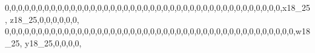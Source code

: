 \documentclass[]{article}
\newenvironment{Shaded}{\begin{snugshade}}{\end{snugshade}}
\newcommand{\DecValTok}[1]{\textcolor[rgb]{0.00,0.00,0.81}{#1}}
\newcommand{\NormalTok}[1]{#1}
\begin{document}
\begin{Shaded}
\begin{Highlighting}[]
\DecValTok{0}\NormalTok{,}\DecValTok{0}\NormalTok{,}\DecValTok{0}\NormalTok{,}\DecValTok{0}\NormalTok{,}\DecValTok{0}\NormalTok{,}\DecValTok{0}\NormalTok{,}\DecValTok{0}\NormalTok{,}\DecValTok{0}\NormalTok{,}\DecValTok{0}\NormalTok{,}\DecValTok{0}\NormalTok{,}\DecValTok{0}\NormalTok{,}\DecValTok{0}\NormalTok{,}\DecValTok{0}\NormalTok{,}\DecValTok{0}\NormalTok{,}\DecValTok{0}\NormalTok{,}\DecValTok{0}\NormalTok{,}\DecValTok{0}\NormalTok{,}\DecValTok{0}\NormalTok{,}\DecValTok{0}\NormalTok{,}\DecValTok{0}\NormalTok{,}\DecValTok{0}\NormalTok{,}\DecValTok{0}\NormalTok{,}\DecValTok{0}\NormalTok{,}\DecValTok{0}\NormalTok{,}\DecValTok{0}\NormalTok{,}\DecValTok{0}\NormalTok{,}\DecValTok{0}\NormalTok{,}\DecValTok{0}\NormalTok{,}\DecValTok{0}\NormalTok{,}\DecValTok{0}\NormalTok{,}\DecValTok{0}\NormalTok{,}\DecValTok{0}\NormalTok{,}\DecValTok{0}\NormalTok{,}\DecValTok{0}\NormalTok{,}\DecValTok{0}\NormalTok{,}\DecValTok{0}\NormalTok{,}\DecValTok{0}\NormalTok{,}\DecValTok{0}\NormalTok{,}\DecValTok{0}\NormalTok{,}\DecValTok{0}\NormalTok{,}\DecValTok{0}\NormalTok{,}\DecValTok{0}\NormalTok{,x18_}\DecValTok{25}\NormalTok{, z18_}\DecValTok{25}\NormalTok{,}\DecValTok{0}\NormalTok{,}\DecValTok{0}\NormalTok{,}\DecValTok{0}\NormalTok{,}\DecValTok{0}\NormalTok{,}\DecValTok{0}\NormalTok{,}\DecValTok{0}\NormalTok{,}
\DecValTok{0}\NormalTok{,}\DecValTok{0}\NormalTok{,}\DecValTok{0}\NormalTok{,}\DecValTok{0}\NormalTok{,}\DecValTok{0}\NormalTok{,}\DecValTok{0}\NormalTok{,}\DecValTok{0}\NormalTok{,}\DecValTok{0}\NormalTok{,}\DecValTok{0}\NormalTok{,}\DecValTok{0}\NormalTok{,}\DecValTok{0}\NormalTok{,}\DecValTok{0}\NormalTok{,}\DecValTok{0}\NormalTok{,}\DecValTok{0}\NormalTok{,}\DecValTok{0}\NormalTok{,}\DecValTok{0}\NormalTok{,}\DecValTok{0}\NormalTok{,}\DecValTok{0}\NormalTok{,}\DecValTok{0}\NormalTok{,}\DecValTok{0}\NormalTok{,}\DecValTok{0}\NormalTok{,}\DecValTok{0}\NormalTok{,}\DecValTok{0}\NormalTok{,}\DecValTok{0}\NormalTok{,}\DecValTok{0}\NormalTok{,}\DecValTok{0}\NormalTok{,}\DecValTok{0}\NormalTok{,}\DecValTok{0}\NormalTok{,}\DecValTok{0}\NormalTok{,}\DecValTok{0}\NormalTok{,}\DecValTok{0}\NormalTok{,}\DecValTok{0}\NormalTok{,}\DecValTok{0}\NormalTok{,}\DecValTok{0}\NormalTok{,}\DecValTok{0}\NormalTok{,}\DecValTok{0}\NormalTok{,}\DecValTok{0}\NormalTok{,}\DecValTok{0}\NormalTok{,}\DecValTok{0}\NormalTok{,}\DecValTok{0}\NormalTok{,}\DecValTok{0}\NormalTok{,}\DecValTok{0}\NormalTok{,}\DecValTok{0}\NormalTok{,}\DecValTok{0}\NormalTok{,w18_}\DecValTok{25}\NormalTok{, y18_}\DecValTok{25}\NormalTok{,}\DecValTok{0}\NormalTok{,}\DecValTok{0}\NormalTok{,}\DecValTok{0}\NormalTok{,}\DecValTok{0}\NormalTok{,}

\end{Highlighting}
\end{Shaded}
\end{document}
